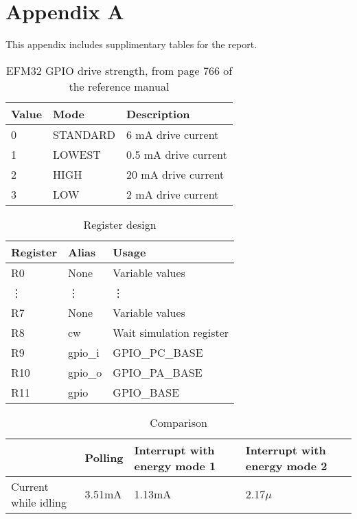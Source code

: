 \section{Appendix A}
\label{appenix:a}

This appendix includes supplimentary tables for the report.

\begin{table}[ht!]
    \begin{center}
    \begin{tabular}{| l | l | l |}
        \hline
        Value   & Mode      & Description \\
        \hline
        0       & STANDARD  & 6 mA drive current \\
        \hline
        1       & LOWEST    & 0.5 mA drive current \\
        \hline
        2       & HIGH      & 20 mA drive current \\
        \hline
        3       & LOW       & 2 mA drive current \\
        \hline
    \end{tabular}
    \caption{EFM32 GPIO drive strength, from page 766 of the reference manual \cite{efm32gg-ref-man}}
    \label{tab:drive_strength}
    \end{center}
\end{table}

\begin{table}[ht!]
    \begin{center}
    \begin{tabular}{ | l | l | l | }
        \hline
        Register    & Alias     & Usage \\
        \hline
        R0          & None      & Variable values\\
        \vdots      & \vdots    & \vdots \\
        R7          & None      & Variable values \\
        \hline
        R8          & cw        & Wait simulation register \\
        \hline
        R9          & gpio\_i   & GPIO\_PC\_BASE \\
        \hline
        R10         & gpio\_o   & GPIO\_PA\_BASE \\
        \hline
        R11         & gpio      & GPIO\_BASE \\
        \hline
    \end{tabular}
    \caption{Register design}
    \label{tab:register_design}
    \end{center}
\end{table}

\begin{table}
    \begin{tabular}{|l|l|l|l|}
    \hline
    ~                    & Polling & Interrupt with  energy mode 1 & Interrupt with  energy mode 2 \\ \hline
    Current while idling & 3.51mA  & 1.13mA                        & 2.17$\mu$                     \\ \hline
    \end{tabular}
    \caption{Comparison}
    \label{tab:comparison}
\end{table}

